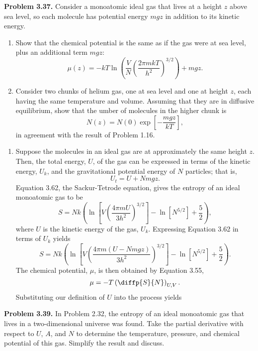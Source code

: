 \documentclass[a4paper, 12pt]{config/homework}
\begin{document}
\pagebreak
\noindent
\textbf{Problem 3.37.} Consider a monoatomic ideal gas that lives at a height \(z\) above sea level, so each molecule has potential energy \(mgz\) in addition to its kinetic energy.
\begin{enumerate}[label=\textbf{(\alph*)}]
\item Show that the chemical potential is the same as if the gas were at sea level, plus an additional term \(mgz\):
\[\mu(z) = - kT\ln\left(\frac{V}{N}\left(\frac{2\pi m k T}{h^2}\right)^{3/2}\right) + mgz.\]
\item Consider two chunks of helium gas, one at sea level and one at height \(z\), each having the same temperature and volume. Assuming that they are in diffusive equilibrium, show that the umber of molecules in the higher chunk is
\[N(z) = N(0)\exp\left[-\frac{mgz}{kT}\right],\]
in agreement with the result of Problem 1.16.
\end{enumerate}
\bigskip
\begin{enumerate}[label=\textbf{(\alph*)}]
\item Suppose the molecules in an ideal gas are at approximately the same height \(z\). Then, the total energy, \(U\), of the gas can be expressed in terms of the kinetic energy, \(U_k\), and the gravitational potential energy of \(N\) particles; that is,
\[U_t = U + Nmgz.\]
Equation 3.62, the Sackur-Tetrode equation, gives the entropy of an ideal monoatomic gas to be
\[S = Nk\left(\ln\left[V\left(\frac{4\pi m U}{3h^2}\right)^{3/2}\right] - \ln\left[N^{5/2}\right]+\frac{5}{2}\right),\]
where \(U\) is the kinetic energy of the gas, \(U_k\). Expressing Equation 3.62 in terms of \(U_k\) yields
\[S = Nk\left(\ln\left[V\left(\frac{4\pi m \left(U - Nmgz\right)}{3h^2}\right)^{3/2}\right] - \ln\left[N^{5/2}\right]+\frac{5}{2}\right).\]
The chemical potential, \(\mu\), is then obtained by Equation 3.55,
\[\mu = -T\left(\diffp{S}{N}\right)_{U,V}.\]
Substituting our definition of \(U\) into the process yields
\end{enumerate}

\pagebreak
\noindent
\textbf{Problem 3.39.} In Problem 2.32, the entropy of an ideal monoatomic gas that lives in a two-dimensional universe was found. Take the partial derivative with respect to \(U\), \(A\), and \(N\) to determine the temperature, pressure, and chemical potential of this gas. Simplify the result and discuss.
\end{document}
